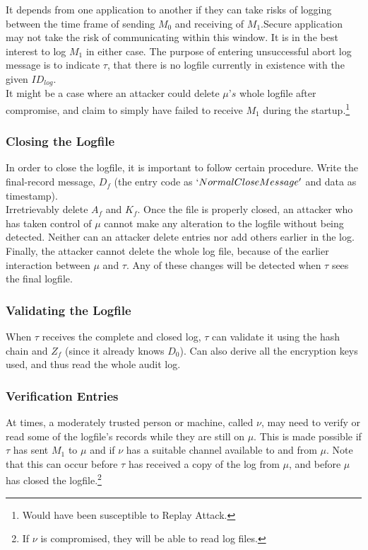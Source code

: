 \documentclass[12pt, letter]{article}
\begin{document}
It depends from one application to another if they can take risks of logging between the time frame of sending $M_0$ and receiving of $M_1$.Secure application may not take the risk of communicating within this window. It is in the best interest to log $M_1$ in either case. The purpose of entering unsuccessful abort log message is to indicate $\tau$, that there is no logfile currently in existence with the given $ID_{log}$.\\

It might be a case where an attacker could delete $\mu’s$ whole logfile after compromise, and claim to simply have failed to receive $M_1$ during the startup.\footnote{Would have been susceptible to Replay Attack.}

\subsubsection{Closing the Logfile}

In order to close the logfile, it is important to follow certain procedure. Write the final-record message, $D_f$ (the entry code as $`NormalCloseMessage'$ and data as timestamp).\\

Irretrievably delete $A_f$ and $K_f$. Once the file is properly closed, an attacker who has taken control of $\mu$ cannot make any alteration to the logfile without being detected. Neither can an attacker delete entries nor add others earlier in the log. Finally, the attacker cannot delete the whole log file, because of the earlier interaction between $\mu$ and $\tau$. Any of these changes will be detected when $\tau$ sees the final logfile.

\subsubsection{Validating the Logfile}
When $\tau$ receives the complete and closed log, $\tau$ can validate it using the hash chain and $Z_f$ (since it already knows $D_0$). Can also derive all the encryption keys used, and thus read the whole audit log.

\subsubsection{Verification Entries}

At times, a moderately trusted person or machine, called $\nu$, may need to verify or read some of the logfile’s records while they are still on $\mu$. This is made possible if $\tau$ has sent $M_1$ to $\mu$ and if $\nu$ has a suitable channel available to and from $\mu$. Note that this can occur before $\tau$ has received a copy of the log from $\mu$, and before $\mu$ has closed the logfile.\footnote{If $\nu$ is compromised, they will be able to read log files.}
\end{document}
